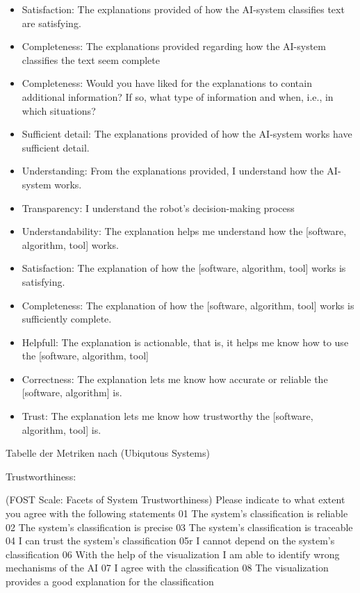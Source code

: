 \begin{itemize}
    \item Satisfaction: The explanations provided of how the AI-system classifies text are satisfying. \cite{riveiro_thats_2021}
    \item Completeness: The explanations provided regarding how the AI-system classifies the text seem complete
 \cite{riveiro_thats_2021}
    \item Completeness: Would you have liked for the explanations to contain additional information? If so, what type of information and when, i.e., in which situations?
 \cite{riveiro_thats_2021}
    \item Sufficient detail: The explanations provided of how the AI-system works have sufficient detail.
 \cite{riveiro_thats_2021}
    \item Understanding: From the explanations provided, I understand how the AI-system works.
 \cite{riveiro_thats_2021}
 \item Transparency: I understand the robot’s decision-making process \cite{wang_is_2018}
 \item Understandability: The explanation helps me understand how the [software, algorithm, tool] works. \cite{hoffman_metrics_nodate}
 \item Satisfaction: The explanation of how the [software, algorithm, tool] works is satisfying. \cite{hoffman_metrics_nodate}
 \item Completeness: The explanation of how the [software, algorithm, tool] works is sufficiently complete. \cite{hoffman_metrics_nodate}
 \item Helpfull: The explanation is actionable, that is, it helps me know how to use the [software, algorithm, tool] \cite{hoffman_metrics_nodate}
 \item Correctness: The explanation lets me know how accurate or reliable the [software, algorithm] is.\cite{hoffman_metrics_nodate}
 \item Trust: The explanation lets me know how trustworthy the [software, algorithm, tool] is. \cite{hoffman_metrics_nodate}
\end{itemize}


Tabelle der Metriken nach \cite{carvalho2017quality} (Ubiqutous Systems)

Trustworthiness: \cite{schrills_color_2020}

(FOST Scale: Facets of System Trustworthiness)
Please indicate to what extent you agree with the following statements 01 The system’s classification is reliable 02 The system’s classification is precise 03 The system’s classification is traceable 04 I can trust the system’s classification 05r I cannot depend on the system’s classification 06 With the help of the visualization I am able to identify wrong mechanisms of the AI 07 I agree with the classification 08 The visualization provides a good explanation for the classification

